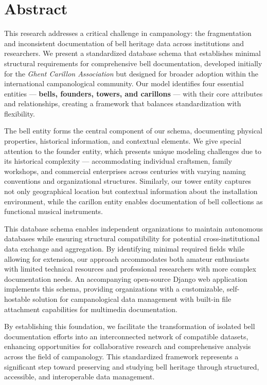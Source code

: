 \documentclass[11pt, a4paper]{article}
\begin{document}
\section{Abstract}

This research addresses a critical challenge in campanology: the fragmentation and inconsistent documentation of bell heritage data across institutions and researchers. We present a standardized database schema that establishes minimal structural requirements for comprehensive bell documentation, developed initially for the \textit{Ghent Carillon Association} but designed for broader adoption within the international campanological community. Our model identifies four essential entities — \textbf{bells, founders, towers, and carillons} — with their core attributes and relationships, creating a framework that balances standardization with flexibility.

The bell entity forms the central component of our schema, documenting physical properties, historical information, and contextual elements. We give special attention to the founder entity, which presents unique modeling challenges due to its historical complexity — accommodating individual craftsmen, family workshops, and commercial enterprises across centuries with varying naming conventions and organizational structures. Similarly, our tower entity captures not only geographical location but contextual information about the installation environment, while the carillon entity enables documentation of bell collections as functional musical instruments.

This database schema enables independent organizations to maintain autonomous databases while ensuring structural compatibility for potential cross-institutional data exchange and aggregation. By identifying minimal required fields while allowing for extension, our approach accommodates both amateur enthusiasts with limited technical resources and professional researchers with more complex documentation needs. An accompanying open-source Django web application implements this schema, providing organizations with a customizable, self-hostable solution for campanological data management with built-in file attachment capabilities for multimedia documentation.

By establishing this foundation, we facilitate the transformation of isolated bell documentation efforts into an interconnected network of compatible datasets, enhancing opportunities for collaborative research and comprehensive analysis across the field of campanology. This standardized framework represents a significant step toward preserving and studying bell heritage through structured, accessible, and interoperable data management.
\end{document}
